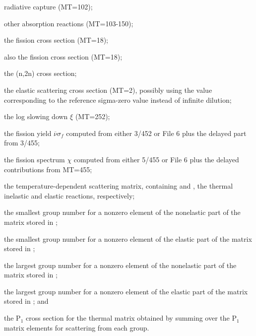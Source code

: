 \begin{list}{}{\setlength{\leftmargin}{2in}\setlength{\labelwidth}{1.7in}}
\begin{singlespace}

\item[\cword{abs1}\hfill] radiative capture (MT=102);

\item[\cword{abs2}\hfill] other absorption reactions (MT=103-150);

\item[\cword{sf0}\hfill] the fission cross section (MT=18);

\item[\cword{ab0}\hfill] also the fission cross section (MT=18);

\item[\cword{sn2n}\hfill] the (n,2n) cross section;

\item[\cword{scat}\hfill] the elastic scattering cross section (MT=2),
possibly using the value corresponding to the reference sigma-zero
value instead of infinite dilution;

\item[\cword{xi}\hfill] the log slowing down $\xi$ (MT=252);

\item[\cword{snus}\hfill] the fission yield $\overline{\nu}\sigma_f$
computed from either 3/452 or File 6 plus the delayed part
from 3/455;

\item[\cword{chi}\hfill] the fission spectrum $\chi$ computed from
either 5/455 or File 6 plus the delayed contributions from
MT=455;

\item[\cword{xs}\hfill] the temperature-dependent scattering matrix,
containing  and , the thermal inelastic
and elastic reactions, respectively;

\item[\cword{l1}\hfill] the smallest group number for a nonzero element
of the nonelastic part of the matrix stored in ;

\item[\cword{l1e}\hfill] the smallest group number for a nonzero element
of the elastic part of the matrix stored in ;

\item[\cword{l2}\hfill] the largest group number for a nonzero element
of the nonelastic part of the matrix stored in ;

\item[\cword{l2e}\hfill] the largest group number for a nonzero element
of the elastic part of the matrix stored in ; and

\item[\cword{csp1}\hfill] the P$_1$ cross section for the thermal
matrix obtained by summing over the P$_1$ matrix elements for
scattering  from each group.

\end{singlespace}
\end{list}

